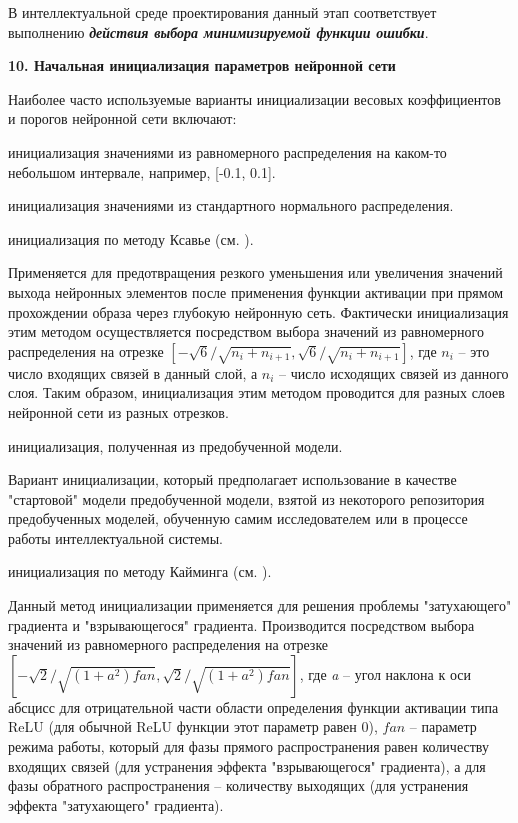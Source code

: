 В интеллектуальной среде проектирования данный этап соответствует выполнению \textbf{\textit{действия выбора минимизируемой функции ошибки}}.


\textbf{10. Начальная инициализация параметров нейронной сети}

Наиболее часто используемые варианты инициализации весовых коэффициентов и порогов нейронной сети включают:
\begin{textitemize}
	\item инициализация значениями из равномерного распределения на каком-то небольшом интервале, например, [-0.1, 0.1].
	\item инициализация значениями из стандартного нормального распределения.
	\item инициализация по методу Ксавье (см. ).

	Применяется для предотвращения резкого уменьшения или увеличения значений выхода нейронных элементов после применения функции активации при прямом прохождении образа через глубокую нейронную сеть. Фактически инициализация этим методом осуществляется посредством выбора значений из равномерного распределения на отрезке $[- \sqrt{6} / \sqrt{n_i+n_{i+1}}, \sqrt{6} / \sqrt{n_i+n_{i+1}}]$, где $n_i$ -- это число входящих связей в данный слой, а $n_i$ -- число исходящих связей из данного слоя. Таким образом, инициализация этим методом проводится для разных слоев нейронной сети из разных отрезков.

	\item инициализация, полученная из предобученной модели.

	Вариант инициализации, который предполагает использование в качестве "стартовой" модели предобученной модели, взятой из некоторого репозитория предобученных моделей, обученную самим исследователем или в процессе работы интеллектуальной системы.

	\item инициализация по методу Кайминга (см. ).

	Данный метод инициализации применяется для решения проблемы "затухающего" градиента и "взрывающегося"
	градиента. Производится посредством выбора значений из равномерного распределения на отрезке $[-\sqrt{2} / \sqrt{(1+a^2)fan}, \sqrt{2} / \sqrt{(1+a^2)fan}]$,
	где \textit{a} -- угол наклона к оси абсцисс для отрицательной части области определения функции активации типа ReLU (для обычной ReLU функции этот параметр равен 0), $fan$ -- параметр режима работы, который для фазы прямого распространения равен количеству входящих связей (для устранения эффекта "взрывающегося" градиента), а для фазы обратного распространения -- количеству выходящих (для устранения эффекта "затухающего" градиента).
\end{textitemize}


